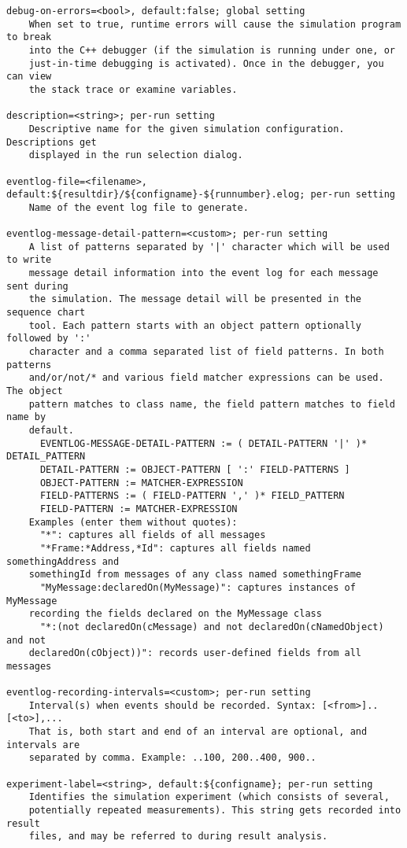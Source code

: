 \begin{verbatim}
debug-on-errors=<bool>, default:false; global setting
    When set to true, runtime errors will cause the simulation program to break
    into the C++ debugger (if the simulation is running under one, or
    just-in-time debugging is activated). Once in the debugger, you can view
    the stack trace or examine variables.

description=<string>; per-run setting
    Descriptive name for the given simulation configuration. Descriptions get
    displayed in the run selection dialog.

eventlog-file=<filename>, default:${resultdir}/${configname}-${runnumber}.elog; per-run setting
    Name of the event log file to generate.

eventlog-message-detail-pattern=<custom>; per-run setting
    A list of patterns separated by '|' character which will be used to write
    message detail information into the event log for each message sent during
    the simulation. The message detail will be presented in the sequence chart
    tool. Each pattern starts with an object pattern optionally followed by ':'
    character and a comma separated list of field patterns. In both patterns
    and/or/not/* and various field matcher expressions can be used. The object
    pattern matches to class name, the field pattern matches to field name by
    default.
      EVENTLOG-MESSAGE-DETAIL-PATTERN := ( DETAIL-PATTERN '|' )* DETAIL_PATTERN
      DETAIL-PATTERN := OBJECT-PATTERN [ ':' FIELD-PATTERNS ]
      OBJECT-PATTERN := MATCHER-EXPRESSION
      FIELD-PATTERNS := ( FIELD-PATTERN ',' )* FIELD_PATTERN
      FIELD-PATTERN := MATCHER-EXPRESSION
    Examples (enter them without quotes):
      "*": captures all fields of all messages
      "*Frame:*Address,*Id": captures all fields named somethingAddress and
    somethingId from messages of any class named somethingFrame
      "MyMessage:declaredOn(MyMessage)": captures instances of MyMessage
    recording the fields declared on the MyMessage class
      "*:(not declaredOn(cMessage) and not declaredOn(cNamedObject) and not
    declaredOn(cObject))": records user-defined fields from all messages

eventlog-recording-intervals=<custom>; per-run setting
    Interval(s) when events should be recorded. Syntax: [<from>]..[<to>],...
    That is, both start and end of an interval are optional, and intervals are
    separated by comma. Example: ..100, 200..400, 900..

experiment-label=<string>, default:${configname}; per-run setting
    Identifies the simulation experiment (which consists of several,
    potentially repeated measurements). This string gets recorded into result
    files, and may be referred to during result analysis.


\end{verbatim}
